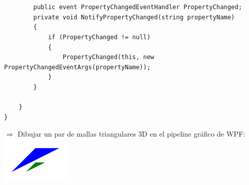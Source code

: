 \documentclass[spanish,12pt,a4paper,final,oneside]{book}
\begin{document}
\begin{lstlisting}[frame=single]
 
 
    	public event PropertyChangedEventHandler PropertyChanged;
    	private void NotifyPropertyChanged(string propertyName)
    	{
        	if (PropertyChanged != null)
        	{
            	PropertyChanged(this, new PropertyChangedEventArgs(propertyName));
        	}
    	}
 
	}
}
\end{lstlisting}


$\Rightarrow$ Dibujar un par de mallas triangulares 3D en el pipeline gráfico de WPF:
\\ \includegraphics{Dibujar en el pipeline 3D de WPF}   
\end{document}
